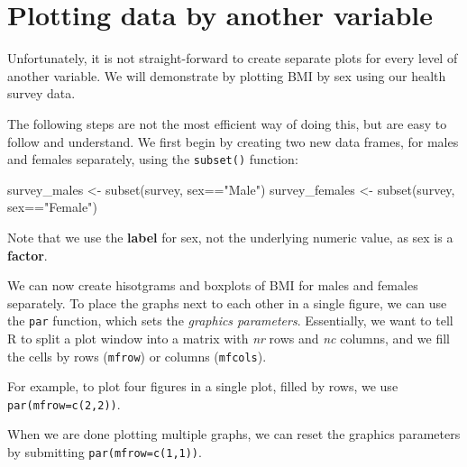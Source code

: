 \documentclass[
]{memoir}
\newenvironment{Shaded}{\begin{snugshade}}{\end{snugshade}}
\newcommand{\FunctionTok}[1]{\textcolor[rgb]{0.00,0.00,0.00}{#1}}
\newcommand{\NormalTok}[1]{#1}
\newcommand{\OtherTok}[1]{\textcolor[rgb]{0.56,0.35,0.01}{#1}}
\newcommand{\SpecialCharTok}[1]{\textcolor[rgb]{0.00,0.00,0.00}{#1}}
\newcommand{\StringTok}[1]{\textcolor[rgb]{0.31,0.60,0.02}{#1}}
\begin{document}
\hypertarget{plotting-data-by-another-variable}{%
\section{Plotting data by another variable}\label{plotting-data-by-another-variable}}

Unfortunately, it is not straight-forward to create separate plots for every level of another variable. We will demonstrate by plotting BMI by sex using our health survey data.

The following steps are not the most efficient way of doing this, but are easy to follow and understand. We first begin by creating two new data frames, for males and females separately, using the \texttt{subset()} function:

\begin{Shaded}
\begin{Highlighting}[]
\NormalTok{survey\_males }\OtherTok{\textless{}{-}} \FunctionTok{subset}\NormalTok{(survey, sex}\SpecialCharTok{==}\StringTok{"Male"}\NormalTok{)}
\NormalTok{survey\_females }\OtherTok{\textless{}{-}} \FunctionTok{subset}\NormalTok{(survey, sex}\SpecialCharTok{==}\StringTok{"Female"}\NormalTok{)}
\end{Highlighting}
\end{Shaded}

Note that we use the \textbf{label} for sex, not the underlying numeric value, as sex is a \textbf{factor}.

We can now create hisotgrams and boxplots of BMI for males and females separately. To place the graphs next to each other in a single figure, we can use the \texttt{par} function, which sets the \emph{graphics parameters}. Essentially, we want to tell R to split a plot window into a matrix with \emph{nr} rows and \emph{nc} columns, and we fill the cells by rows (\texttt{mfrow}) or columns (\texttt{mfcols}).

For example, to plot four figures in a single plot, filled by rows, we use \texttt{par(mfrow=c(2,2))}.

When we are done plotting multiple graphs, we can reset the graphics parameters by submitting \texttt{par(mfrow=c(1,1))}.
\end{document}
